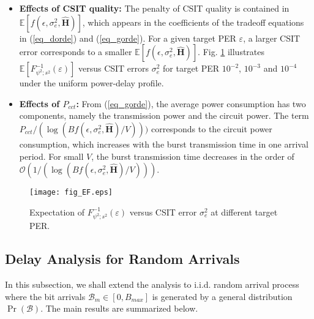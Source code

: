 \documentclass[11pt,journal, onecolumn]{./IEEEtran}
\newcommand{\red}{\color{black}}
\begin{document}
\begin{Remark}
\begin{itemize}
\item {\bf Effects of CSIT quality:} The penalty of CSIT quality is contained in {\red $\mathbb{E}[f(\epsilon,\sigma_e^2,\mathbf{\hat{H}})]$}, which appears in the coefficients of the tradeoff equations in (\ref{eq_dorde}) and (\ref{eq_gorde}). For a given target PER $\varepsilon$, a larger CSIT error corresponds to a smaller {\red $\mathbb{E}[f(\epsilon,\sigma_e^2,\mathbf{\hat{H}})]$}. Fig. \ref{fig_EF} illustrates $\mathbb{E}[F_{{\psi ^2};{s^2}}^{ - 1}( \varepsilon)]$ versus CSIT errors $\sigma_e^2$ for target PER $10^{-2}$, $10^{-3}$ and $10^{-4}$ {\red under the uniform power-delay profile}.

\item {\bf Effects of $P_{cct}$:} From (\ref{eq_gorde}), the average power consumption has two components, namely the transmission power and the circuit power. The term $P_{cct}/({{ \log ({B }f(\epsilon,\sigma_e^2,\mathbf{\hat{H}})/V)}}))$ corresponds to the circuit power consumption, which increases with the burst transmission time in one arrival period. For small $V$, the burst transmission time decreases in the order of $\mathcal O(1/({{ \log ({B }f(\epsilon,\sigma_e^2,\mathbf{\hat{H}})/V)}}))$.
~\hfill\IEEEQED
\end{itemize}
\end{Remark}

\begin{figure}[t!]
\centering
\texttt{[image: fig\_EF.eps]}
\caption{Expectation of $F_{{\psi ^2};{s^2}}^{ - 1}( \varepsilon)$ versus CSIT error $\sigma^2_e$ at different target PER.} \label{fig_EF}
\end{figure}

\subsection{Delay Analysis for Random Arrivals}

In this subsection, we shall extend the analysis to i.i.d. random arrival process where the bit arrivals $\mathcal B_m\in [0, B_{max}]$ is generated by a general distribution $\Pr(\mathcal B)$. The main results are summarized below.
\end{document}
